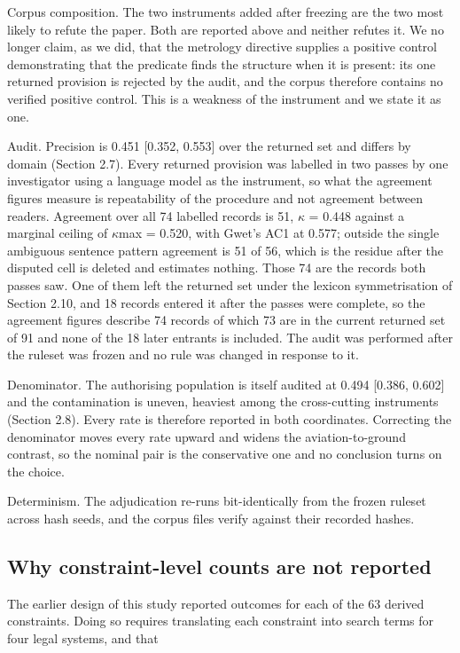 Corpus composition. The two instruments added after freezing are the two most likely to refute the paper. Both are reported above and neither refutes it. We no longer claim, as we did, that the metrology directive supplies a positive control demonstrating that the predicate finds the structure when it is present: its one returned provision is rejected by the audit, and the corpus therefore contains no verified positive control. This is a weakness of the instrument and we state it as one.

Audit. Precision is 0.451 [0.352, 0.553] over the returned set and differs by domain (Section 2.7). Every returned provision was labelled in two passes by one investigator using a language model as the instrument, so what the agreement figures measure is repeatability of the procedure and not agreement between readers. Agreement over all 74 labelled records is 51, $\kappa$ = 0.448 against a marginal ceiling of $\kappa$max = 0.520, with Gwet's AC1 at 0.577; outside the single ambiguous sentence pattern agreement is 51 of 56, which is the residue after the disputed cell is deleted and estimates nothing. Those 74 are the records both passes saw. One of them left the returned set under the lexicon symmetrisation of Section 2.10, and 18 records entered it after the passes were complete, so the agreement figures describe 74 records of which 73 are in the current returned set of 91 and none of the 18 later entrants is included. The audit was performed after the ruleset was frozen and no rule was changed in response to it.

Denominator. The authorising population is itself audited at 0.494 [0.386, 0.602] and the contamination is uneven, heaviest among the cross-cutting instruments (Section 2.8). Every rate is therefore reported in both coordinates. Correcting the denominator moves every rate upward and widens the aviation-to-ground contrast, so the nominal pair is the conservative one and no conclusion turns on the choice.

Determinism. The adjudication re-runs bit-identically from the frozen ruleset across hash seeds, and the corpus files verify against their recorded hashes.

\subsection{Why constraint-level counts are not reported}\label{sec:3.8}

The earlier design of this study reported outcomes for each of the 63 derived constraints. Doing so requires translating each constraint into search terms for four legal systems, and that

